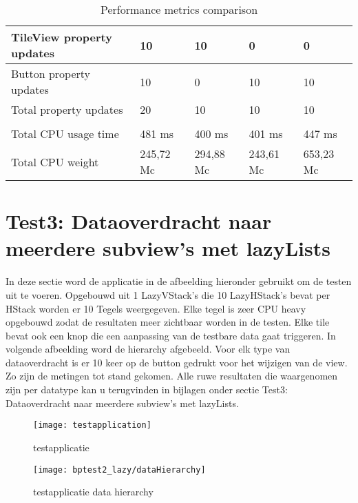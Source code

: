 \begin{table}[H]
\begin{tabularx}{\textwidth}{|>{\raggedright\arraybackslash}m{5cm}|X|X|X|X|}
        \hline
        TileView property updates & 10 & 10 & 0 & 0 \\
        \hline
        Button property updates & 10 & 0 & 10 & 10 \\
        \hline
        Total property updates & 20 & 10 & 10 & 10 \\
        \hline
        \multicolumn{5}{|l|}{\textbf{CPU usage}} \\
        \hline
        Total CPU usage time & 481 ms & 400 ms & 401 ms & 447 ms \\
        \hline
        Total CPU weight & 245,72 Mc & 294,88 Mc & 243,61 Mc & 653,23 Mc \\
        \hline
    \end{tabularx}
    \caption{Performance metrics comparison}
    \label{tab:performance_metrics}
\end{table}


\section{Test3: Dataoverdracht naar meerdere subview's met lazyLists}
In deze sectie word de applicatie in de afbeelding hieronder gebruikt om de testen uit te voeren. Opgebouwd uit 1 LazyVStack's die 10 LazyHStack's bevat per HStack worden er 10 Tegels weergegeven. Elke tegel is zeer CPU heavy opgebouwd zodat de resultaten meer zichtbaar worden in de testen. Elke tile bevat ook een knop die een aanpassing van de testbare data gaat triggeren. In volgende afbeelding word de hierarchy afgebeeld. Voor elk type van dataoverdracht is er 10 keer op de button gedrukt voor het wijzigen van de view. Zo zijn de metingen tot stand gekomen. Alle ruwe resultaten die waargenomen zijn per datatype kan u terugvinden in bijlagen onder sectie Test3: Dataoverdracht naar meerdere subview's met lazyLists.
\begin{figure}[H]
    \centering
    \texttt{[image: testapplication]} 
    \caption{testapplicatie}
    \label{fig:testapplication2}
\end{figure}
\begin{figure}[H]
    \centering
    \texttt{[image: bptest2\_lazy/dataHierarchy]} 
    \caption{testapplicatie data hierarchy}
    \label{fig:testapplicationHierarchy2}
\end{figure}

